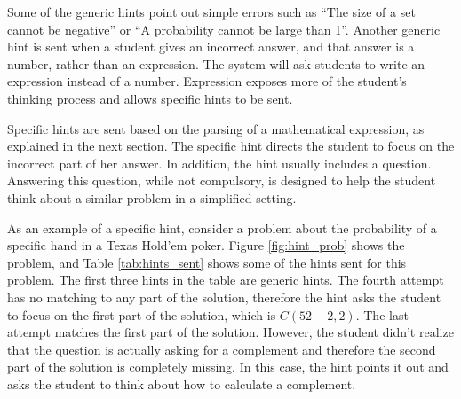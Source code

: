 \documentclass{llncs2e/llncs}
\begin{document}
Some of the generic hints point out simple errors such as ``The size of a set cannot be negative'' or ``A probability cannot be large than 1''. Another generic hint is sent when a student gives an incorrect answer, and that answer is a number, rather than an expression. The system will ask students to write an expression instead of a number. Expression exposes more of the student's thinking process and allows specific hints to be sent.

Specific hints are sent based on the parsing of a mathematical expression, as explained in the next section. The specific hint
directs the student to focus on the incorrect part of her answer.  In addition, the hint usually includes a question. Answering this
question, while not compulsory, is designed to help the student think about a similar problem in a simplified setting.

As an example of a specific hint, consider a problem about the probability of a specific hand in a Texas Hold'em poker. Figure
\ref{fig:hint_prob} shows the problem, and Table \ref{tab:hints_sent} shows some of the hints sent for this problem. The first three hints in the table are generic hints. The fourth attempt has no matching to any part of the solution, therefore the hint asks the student to focus on the first part of the solution, which is $C(52-2,2)$. The last attempt matches the first part of the solution. However, the student didn't realize that the question is actually asking for a complement and therefore the second part of the solution is completely missing. In this case, the hint points it out and asks the student to think about how to calculate a complement.
\end{document}
